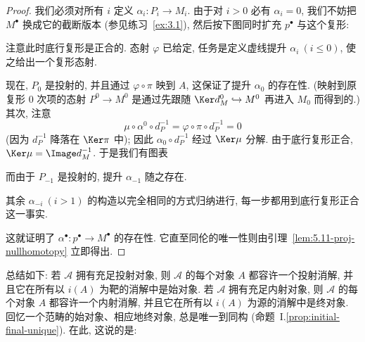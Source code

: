 \begin{proof}
我们必须对所有 $i$ 定义 $\alpha_i:P_i\to M_i$. 由于对 $i>0$ 必有 $\alpha_i=0$, 我们不妨把 $M^\bullet$ 换成它的截断版本 (参见练习~\ref{ex:3.1}), 然后按下图同时扩充 $p^\bullet$ 与这个复形:

\begin{center}
\end{center}

注意此时底行复形是正合的. 态射 $\varphi$ 已给定, 任务是定义虚线提升 $\alpha_i\ (i\leqslant 0)$, 使之给出一个复形态射.

现在, $P_0$ 是投射的, 并且通过 $\varphi\circ\pi$ 映到 $A$, 这保证了提升 $\alpha_0$ 的存在性. (映射到原复形 $0$ 次项的态射 $P^0\to M^0$ 是通过先跟随 $\Ker d_M^0\hookrightarrow M^0$ 再进入 $M_0$ 而得到的.) 其次, 注意
\[
\mu\circ\alpha^0\circ d_P^{-1}=\varphi\circ\pi\circ d_P^{-1}=0
\]
(因为 $d^{-1}_P$ 降落在 $\Ker\pi$ 中); 因此 $\alpha_0\circ d^{-1}_P$ 经过 $\Ker\mu$ 分解. 由于底行复形正合, $\Ker\mu=\Image d^{-1}_M$. 于是我们有图表

\begin{center}
\end{center}

\noindent 而由于 $P_{-1}$ 是投射的, 提升 $\alpha_{-1}$ 随之存在.

其余 $\alpha_{-i}\ (i>1)$ 的构造以完全相同的方式归纳进行, 每一步都用到底行复形正合这一事实.

这就证明了 $\alpha^\bullet:p^\bullet\to M^\bullet$ 的存在性. 它直至同伦的唯一性则由引理~\ref{lem:5.11-proj-nullhomotopy} 立即得出.
\end{proof}

\noindent 总结如下: 若 $\mathcal{A}$ 拥有充足投射对象, 则 $\mathcal{A}$ 的每个对象 $A$ 都容许一个投射消解, 并且它在所有以 $i(A)$ 为靶的消解中是始对象. 若 $\mathcal{A}$ 拥有充足内射对象, 则 $\mathcal{A}$ 的每个对象 $A$ 都容许一个内射消解, 并且它在所有以 $i(A)$ 为源的消解中是终对象. 回忆一个范畴的始对象、相应地终对象, 总是唯一到同构 (命题~I.\ref{prop:initial-final-unique}). 在此, 这说的是:

